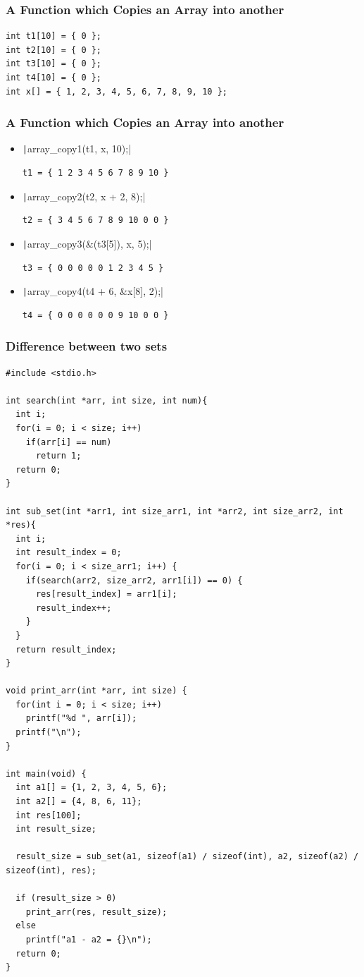 \documentclass{../c-lecture}
\begin{document}
\begin{frame}[fragile]
  \frametitle{A Function which Copies an Array into another}
  \begin{verbatim}
int t1[10] = { 0 };
int t2[10] = { 0 };
int t3[10] = { 0 };
int t4[10] = { 0 };
int x[] = { 1, 2, 3, 4, 5, 6, 7, 8, 9, 10 };
  \end{verbatim}
\end{frame}

\begin{frame}[fragile]
  \frametitle{A Function which Copies an Array into another}
  \begin{itemize}
    \item \texttt|array_copy1(t1, x, 10);|
    \begin{verbatim}
t1 = { 1 2 3 4 5 6 7 8 9 10 }
    \end{verbatim}
    \item \texttt|array_copy2(t2, x + 2, 8);|
    \begin{verbatim}
t2 = { 3 4 5 6 7 8 9 10 0 0 }
    \end{verbatim}
    \item \texttt|array_copy3(&(t3[5]), x, 5);|
    \begin{verbatim}
t3 = { 0 0 0 0 0 1 2 3 4 5 }
    \end{verbatim}
    \item \texttt|array_copy4(t4 + 6, &x[8], 2);|
    \begin{verbatim}
t4 = { 0 0 0 0 0 0 9 10 0 0 }
    \end{verbatim}
  \end{itemize}
\end{frame}

\begin{frame}[fragile]
  \frametitle{Difference between two sets}
  \begin{verbatim}
#include <stdio.h>

int search(int *arr, int size, int num){
  int i;
  for(i = 0; i < size; i++)
    if(arr[i] == num)
      return 1;
  return 0;
}

int sub_set(int *arr1, int size_arr1, int *arr2, int size_arr2, int *res){
  int i;
  int result_index = 0;
  for(i = 0; i < size_arr1; i++) {
    if(search(arr2, size_arr2, arr1[i]) == 0) {
      res[result_index] = arr1[i];
      result_index++;
    }
  }
  return result_index;
}

void print_arr(int *arr, int size) {
  for(int i = 0; i < size; i++)
    printf("%d ", arr[i]);
  printf("\n");
}

int main(void) {
  int a1[] = {1, 2, 3, 4, 5, 6};
  int a2[] = {4, 8, 6, 11};
  int res[100];
  int result_size;

  result_size = sub_set(a1, sizeof(a1) / sizeof(int), a2, sizeof(a2) / sizeof(int), res);

  if (result_size > 0)
    print_arr(res, result_size);
  else
    printf("a1 - a2 = {}\n");
  return 0;
}
  \end{verbatim}
\end{frame}
\end{document}
